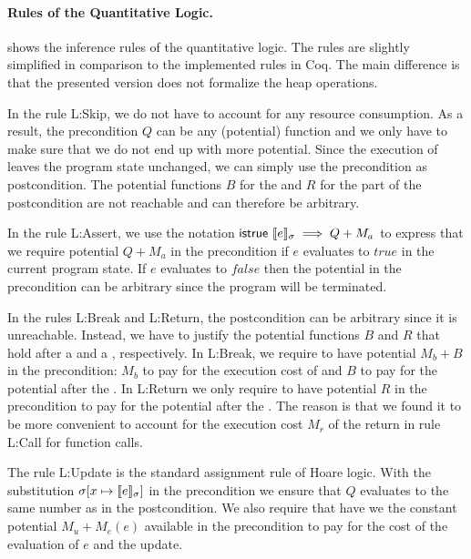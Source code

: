\documentclass[nocopyrightspace,preprint]{sigplanconf}
\newcommand{\pref}[1]{\prettyref{#1}}
\begin{document}
\paragraph{Rules of the Quantitative Logic.}

\pref{fig:logic} shows the inference rules of the quantitative logic.
The rules are slightly simplified in comparison to the implemented
rules in Coq.  The main difference is that the presented version does
not formalize the heap operations.

In the rule {\sc L:Skip}, we do not have to account for any resource
consumption.  As a result, the precondition $Q$ can be any (potential)
function and we only have to make sure that we do not end up with more
potential.  Since the execution of  leaves the program
state unchanged, we can simply use the precondition as postcondition.
The potential functions $B$ for the  and $R$ for the
 part of the postcondition are not reachable and can
therefore be arbitrary.

In the rule {\sc L:Assert}, we use the notation
$\mathsf{istrue}~\llbracket e \rrbracket_{\sigma} \implies Q + M_a$ to express that we
require potential $Q + M_a$ in the precondition if $e$ evaluates to
$\mathit{true}$ in the current program state.  If $e$ evaluates to
$\mathit{false}$ then the potential in the precondition can be
arbitrary since the program will be terminated.

In the rules {\sc L:Break} and {\sc L:Return}, the postcondition can
be arbitrary since it is unreachable.  Instead, we have to justify the
potential functions $B$ and $R$ that hold after a  and a
, respectively.  In {\sc L:Break}, we require to have
potential $M_b+B$ in the precondition: $M_b$ to pay for the execution
cost of  and $B$ to pay for the potential after the
.  In {\sc L:Return} we only require to have potential
$R$ in the precondition to pay for the potential after the
.  The reason is that we found it to be more convenient
to account for the execution cost $M_r$ of the return in rule {\sc
  L:Call} for function calls.

The rule {\sc L:Update} is the standard assignment rule of Hoare
logic.  With the substitution $\sigma[x \mapsto \llbracket e \rrbracket_{\sigma}]$ in
the precondition we ensure that $Q$ evaluates to the same number as in
the postcondition.  We also require that have we the constant
potential $M_u + M_e(e)$ available in the precondition to pay for the
cost of the evaluation of $e$ and the update.
\end{document}

